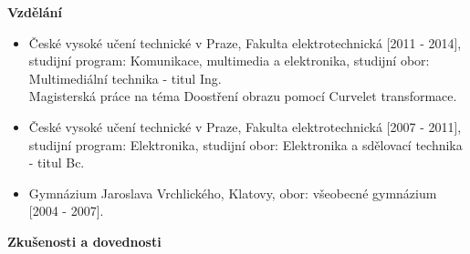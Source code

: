 \documentclass[12pt]{article}
\begin{document}
\textbf{Vzdělání}

\begin{itemize}
\item České vysoké učení technické v Praze, Fakulta elektrotechnická [2011 - 2014], studijní program: Komunikace, multimedia a elektronika, studijní obor: Multimediální technika - titul Ing. \\
Magisterská práce na téma Doostření obrazu pomocí Curvelet transformace.

\item České vysoké učení technické v Praze, Fakulta elektrotechnická [2007 - 2011], studijní program: Elektronika, studijní obor: Elektronika a sdělovací technika - titul Bc.


\item Gymnázium Jaroslava Vrchlického, Klatovy, 
obor: všeobecné gymnázium [2004 - 2007].
\end{itemize}

\textbf{Zkušenosti a dovednosti}
\end{document}
